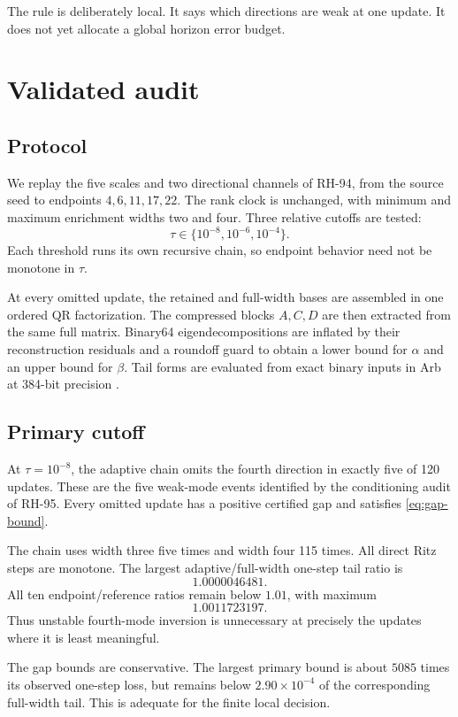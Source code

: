 \documentclass[11pt]{article}
\theoremstyle{definition}
\theoremstyle{remark}
\begin{document}
The rule is deliberately local.  It says which directions are weak at one
update.  It does not yet allocate a global horizon error budget.

\section{Validated audit}
\label{sec:audit}

\subsection{Protocol}

We replay the five scales and two directional channels of RH-94, from the
source seed to endpoints $4,6,11,17,22$.  The rank clock is unchanged, with
minimum and maximum enrichment widths two and four.  Three relative cutoffs
are tested:
\[
 \tau\in\{10^{-8},10^{-6},10^{-4}\}.
\]
Each threshold runs its own recursive chain, so endpoint behavior need not be
monotone in $\tau$.

At every omitted update, the retained and full-width bases are assembled in
one ordered QR factorization.  The compressed blocks $A,C,D$ are then
extracted from the same full matrix.  Binary64 eigendecompositions are
inflated by their reconstruction residuals and a roundoff guard to obtain a
lower bound for $\alpha$ and an upper bound for $\beta$.  Tail forms are
evaluated from exact binary inputs in Arb at 384-bit precision
\citep{Rump2010}.

\subsection{Primary cutoff}

At $\tau=10^{-8}$, the adaptive chain omits the fourth direction in exactly
five of 120 updates.  These are the five weak-mode events identified by the
conditioning audit of RH-95.  Every omitted update has a positive certified
gap and satisfies \eqref{eq:gap-bound}.

The chain uses width three five times and width four 115 times.  All direct
Ritz steps are monotone.  The largest adaptive/full-width one-step tail ratio
is
\[
 1.0000046481.
\]
All ten endpoint/reference ratios remain below $1.01$, with maximum
\[
 1.0011723197.
\]
Thus unstable fourth-mode inversion is unnecessary at precisely the updates
where it is least meaningful.

The gap bounds are conservative.  The largest primary bound is about
$5085$ times its observed one-step loss, but remains below
$2.90\times10^{-4}$ of the corresponding full-width tail.  This is adequate
for the finite local decision.
\end{document}
